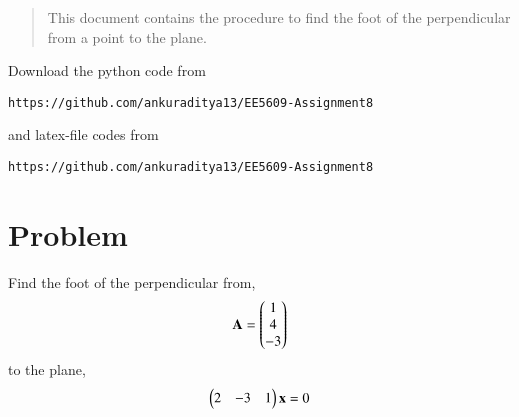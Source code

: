 \documentclass[journal,12pt,twocolumn]{IEEEtran}
\begin{document}
\begin{abstract}
This document contains the procedure to find the foot of the perpendicular from a point to the plane.
\end{abstract}
Download the python code from 
\begin{lstlisting}
https://github.com/ankuraditya13/EE5609-Assignment8
\end{lstlisting}
%
and latex-file codes from 
%
\begin{lstlisting}
https://github.com/ankuraditya13/EE5609-Assignment8
\end{lstlisting}

\section{Problem}
Find the foot of the perpendicular from,
\begin{align}
\mathbf{A} = \begin{pmatrix}1\\4\\-3\end{pmatrix}
\end{align} 
to the plane,
\begin{align}
\begin{pmatrix}2&-3&1\end{pmatrix}\mathbf{x} = 0
\label{Q}
\end{align}
\end{document}
